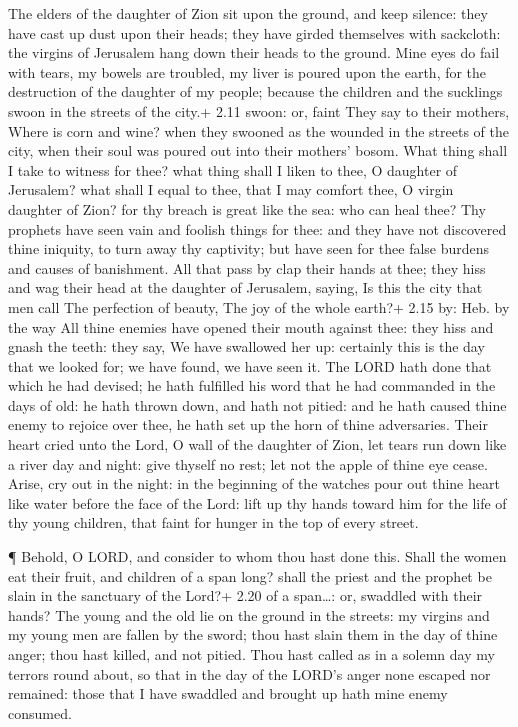  The elders of the daughter of Zion sit upon the ground,
and keep silence: they have cast up dust upon their heads; they have
girded themselves with sackcloth: the virgins of Jerusalem hang down
their heads to the ground.  Mine eyes do fail with tears,
my bowels are troubled, my liver is poured upon the earth, for the
destruction of the daughter of my people; because the children and the
sucklings swoon in the streets of the city.+ 2.11 swoon: or, faint
 They say to their mothers, Where is corn and wine? when
they swooned as the wounded in the streets of the city, when their soul
was poured out into their mothers' bosom.  What thing shall
I take to witness for thee? what thing shall I liken to thee, O daughter
of Jerusalem? what shall I equal to thee, that I may comfort thee, O
virgin daughter of Zion? for thy breach is great like the sea: who can
heal thee?  Thy prophets have seen vain and foolish things
for thee: and they have not discovered thine iniquity, to turn away thy
captivity; but have seen for thee false burdens and causes of
banishment.  All that pass by clap their hands at thee;
they hiss and wag their head at the daughter of Jerusalem, saying, Is
this the city that men call The perfection of beauty, The joy of the
whole earth?+ 2.15 by: Heb. by the way  All thine enemies
have opened their mouth against thee: they hiss and gnash the teeth:
they say, We have swallowed her up: certainly this is the day that we
looked for; we have found, we have seen it.  The LORD hath
done that which he had devised; he hath fulfilled his word that he had
commanded in the days of old: he hath thrown down, and hath not pitied:
and he hath caused thine enemy to rejoice over thee, he hath set up the
horn of thine adversaries.  Their heart cried unto the
Lord, O wall of the daughter of Zion, let tears run down like a river
day and night: give thyself no rest; let not the apple of thine eye
cease.  Arise, cry out in the night: in the beginning of
the watches pour out thine heart like water before the face of the Lord:
lift up thy hands toward him for the life of thy young children, that
faint for hunger in the top of every street.

 ¶ Behold, O LORD, and consider to whom thou hast done
this. Shall the women eat their fruit, and children of a span long?
shall the priest and the prophet be slain in the sanctuary of the Lord?+
2.20 of a span\ldots: or, swaddled with their hands?  The
young and the old lie on the ground in the streets: my virgins and my
young men are fallen by the sword; thou hast slain them in the day of
thine anger; thou hast killed, and not pitied.  Thou hast
called as in a solemn day my terrors round about, so that in the day of
the LORD's anger none escaped nor remained: those that I have swaddled
and brought up hath mine enemy consumed.

